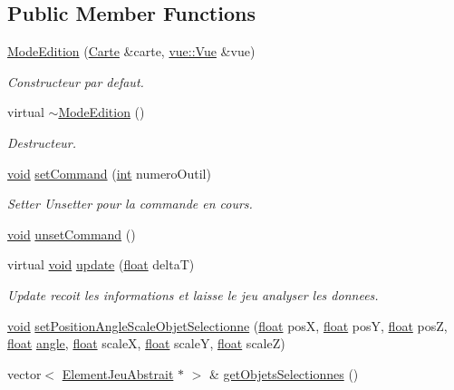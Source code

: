 \subsection*{Public Member Functions}
\begin{DoxyCompactItemize}
\item 
\hyperlink{group__inf2990_ga07a8a0dff9f4a4469ebe462be64b20c5}{Mode\-Edition} (\hyperlink{class_carte}{Carte} \&carte, \hyperlink{classvue_1_1_vue}{vue\-::\-Vue} \&vue)
\begin{DoxyCompactList}\small\item\em Constructeur par defaut. \end{DoxyCompactList}\item 
virtual \hyperlink{group__inf2990_gae3468af0e1eea13d063a084401c34a05}{$\sim$\-Mode\-Edition} ()
\begin{DoxyCompactList}\small\item\em Destructeur. \end{DoxyCompactList}\item 
\hyperlink{wglew_8h_aeea6e3dfae3acf232096f57d2d57f084}{void} \hyperlink{group__inf2990_gac35939dea30e8f7de122a30e7d38d9a0}{set\-Command} (\hyperlink{wglew_8h_a500a82aecba06f4550f6849b8099ca21}{int} numero\-Outil)
\begin{DoxyCompactList}\small\item\em Setter Unsetter pour la commande en cours. \end{DoxyCompactList}\item 
\hyperlink{wglew_8h_aeea6e3dfae3acf232096f57d2d57f084}{void} \hyperlink{group__inf2990_ga6afae356465e03636187c5e62190c501}{unset\-Command} ()
\item 
virtual \hyperlink{wglew_8h_aeea6e3dfae3acf232096f57d2d57f084}{void} \hyperlink{group__inf2990_ga39858d3c94a25354f54068c3b32cab2a}{update} (\hyperlink{fmod_8h_aeb841aa4b4b5f444b5d739d865b420af}{float} delta\-T)
\begin{DoxyCompactList}\small\item\em Update recoit les informations et laisse le jeu analyser les donnees. \end{DoxyCompactList}\item 
\hyperlink{wglew_8h_aeea6e3dfae3acf232096f57d2d57f084}{void} \hyperlink{group__inf2990_ga47db3339cda33fdc249548620e0dcc8f}{set\-Position\-Angle\-Scale\-Objet\-Selectionne} (\hyperlink{fmod_8h_aeb841aa4b4b5f444b5d739d865b420af}{float} pos\-X, \hyperlink{fmod_8h_aeb841aa4b4b5f444b5d739d865b420af}{float} pos\-Y, \hyperlink{fmod_8h_aeb841aa4b4b5f444b5d739d865b420af}{float} pos\-Z, \hyperlink{fmod_8h_aeb841aa4b4b5f444b5d739d865b420af}{float} \hyperlink{glew_8h_a6d7a98b0d979b9411a4344a98a7a6122}{angle}, \hyperlink{fmod_8h_aeb841aa4b4b5f444b5d739d865b420af}{float} scale\-X, \hyperlink{fmod_8h_aeb841aa4b4b5f444b5d739d865b420af}{float} scale\-Y, \hyperlink{fmod_8h_aeb841aa4b4b5f444b5d739d865b420af}{float} scale\-Z)
\item 
vector$<$ \hyperlink{class_element_jeu_abstrait}{Element\-Jeu\-Abstrait} $\ast$ $>$ \& \hyperlink{group__inf2990_ga75b06b061177f481474fd9d0a9892f94}{get\-Objets\-Selectionnes} ()
\end{DoxyCompactItemize}
